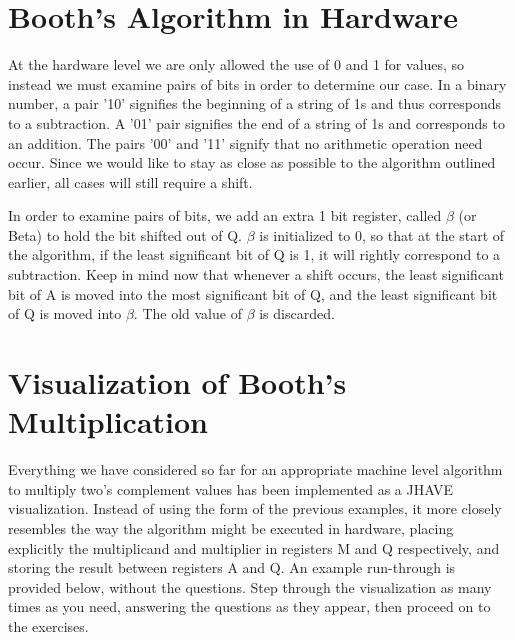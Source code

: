 \documentclass{article}
\begin{document}
\section{Booth's Algorithm in Hardware}
    At the hardware level we are only allowed the use of 0 and 1 for values, so instead we must examine pairs of bits in order to determine our case.
In a binary number, a pair '10' signifies the beginning of a string of 1s and thus corresponds to a subtraction.
A '01' pair signifies the end of a string of 1s and corresponds to an addition.
The pairs '00' and '11' signify that no arithmetic operation need occur.
Since we would like to stay as close as possible to the algorithm outlined earlier, all cases will still require a shift.

    In order to examine pairs of bits, we add an extra 1 bit register, called $\beta$ (or Beta) to hold the bit shifted out of Q.
$\beta$ is initialized to 0, so that at the start of the algorithm, if the least significant bit of Q is 1, it will rightly correspond to a subtraction.
Keep in mind now that whenever a shift occurs, the least significant bit of A is moved into the most significant bit of Q, and the least significant bit of Q is moved into $\beta$.
The old value of $\beta$ is discarded.

\section{Visualization of Booth's Multiplication}
Everything we have considered so far for an appropriate machine level algorithm to multiply two's complement values has been implemented as a JHAVE visualization.
Instead of using the form of the previous examples, it more closely resembles the way the algorithm might be executed in hardware, placing explicitly the multiplicand and multiplier in registers M and Q respectively, and storing the result between registers A and Q.
An example run-through is provided below, without the questions.
Step through the visualization as many times as you need, answering the questions as they appear, then proceed on to the exercises.


%
%
\end{document}
